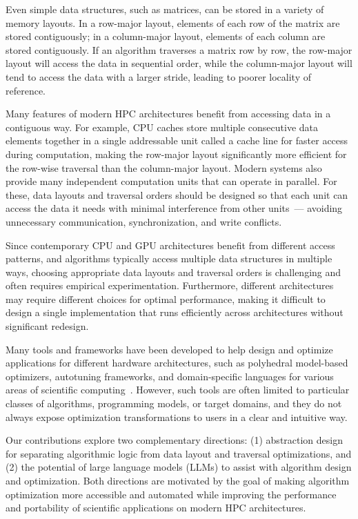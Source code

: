 Even simple data structures, such as matrices, can be stored in a variety of memory layouts. In a row-major layout, elements of each row of the matrix are stored contiguously; in a column-major layout, elements of each column are stored contiguously. If an algorithm traverses a matrix row by row, the row-major layout will access the data in sequential order, while the column-major layout will tend to access the data with a larger stride, leading to poorer locality of reference.

Many features of modern HPC architectures benefit from accessing data in a contiguous way. For example, CPU caches store multiple consecutive data elements together in a single addressable unit called a cache line for faster access during computation, making the row-major layout significantly more efficient for the row-wise traversal than the column-major layout.
Modern systems also provide many independent computation units that can operate in parallel. For these, data layouts and traversal orders should be designed so that each unit can access the data it needs with minimal interference from other units~--- avoiding unnecessary communication, synchronization, and write conflicts.

Since contemporary CPU and GPU architectures benefit from different access patterns, and algorithms typically access multiple data structures in multiple ways, choosing appropriate data layouts and traversal orders is challenging and often requires empirical experimentation. Furthermore, different architectures may require different choices for optimal performance, making it difficult to design a single implementation that runs efficiently across architectures without significant redesign.

Many tools and frameworks have been developed to help design and optimize applications for different hardware architectures, such as polyhedral model-based optimizers, autotuning frameworks, and domain-specific languages for various areas of scientific computing~\cite{bondhugula2008pluto,ansel2014opentuner,ragan2013halide,baghdadi2019tiramisu}. However, such tools are often limited to particular classes of algorithms, programming models, or target domains, and they do not always expose optimization transformations to users in a clear and intuitive way.

Our contributions explore two complementary directions: (1) abstraction design for separating algorithmic logic from data layout and traversal optimizations, and (2) the potential of large language models (LLMs) to assist with algorithm design and optimization. Both directions are motivated by the goal of making algorithm optimization more accessible and automated while improving the performance and portability of scientific applications on modern HPC architectures.

